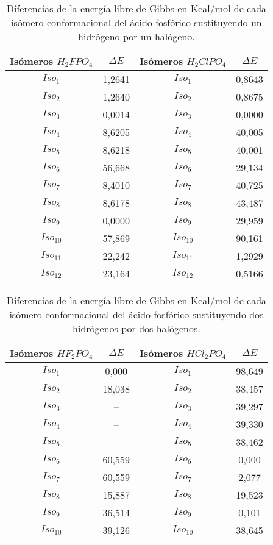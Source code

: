 \begin{table}[H]
\begin{center}
\begin{tabular}{|c|c|c|c|}
\hline
Isómeros $H_2FPO_4$ & $\Delta E$ & Isómeros $H_2ClPO_4$ & $\Delta E$ \\ \hline
$Iso_1$& 1,2641 & $Iso_1$ & 0,8643 \\ \hline
$Iso_2$ & 1,2640 & $Iso_2$ & 0,8675 \\ \hline
$Iso_3$ & 0,0014 & $Iso_3$ & 0,0000 \\ \hline
$Iso_4$	& 8,6205 & $Iso_4$ & 40,005 \\ \hline
$Iso_5$	& 8,6218 & $Iso_5$ & 40,001 \\ \hline
$Iso_6$	& 56,668 & $Iso_6$ & 29,134 \\ \hline
$Iso_7$	& 8,4010 & $Iso_7$ & 40,725 \\ \hline
$Iso_8$	& 8,6178 & $Iso_8$ & 43,487 \\ \hline
$Iso_9$	& 0,0000 & $Iso_9$ & 29,959 \\ \hline
$Iso_{10}$	& 57,869 & $Iso_{10}$ & 90,161 \\ \hline
$Iso_{11}$ & 22,242 & $Iso_{11}$ & 1,2929 \\ \hline
$Iso_{12}$ & 23,164 & $Iso_{12}$ & 0,5166 \\ \hline
\end{tabular}
\caption{Diferencias de la energía libre de Gibbs en Kcal/mol de cada isómero conformacional del ácido fosfórico sustituyendo un hidrógeno por un halógeno.}
\end{center}
\end{table}

\begin{table}[H]
	\centering
	\begin{tabular}{|c|c|c|c|}
		\hline
		Isómeros $HF_2PO_4$ & $\Delta E$   & Isómeros $HCl_2PO_4$ & $\Delta E$     \\ \hline
		$Iso_1$  & 0,000     & $Iso_1$     & 98,649 \\ \hline
		$Iso_2$  & 18,038    & $Iso_2$   & 38,457 \\ \hline
		$Iso_3$   & -- & $Iso_3$    & 39,297 \\ \hline
		$Iso_4$   & --& $Iso_4$    & 39,330 \\ \hline
		$Iso_5$   & -- & $Iso_5$  & 38,462 \\ \hline
		$Iso_6$    & 60,559    & $Iso_6$  & 0,000  \\ \hline
		$Iso_7$   & 60,559    & $Iso_7$   & 2,077  \\ \hline
		$Iso_8$    & 15,887    & $Iso_8$  & 19,523 \\ \hline
		$Iso_9$   & 36,514    & $Iso_9$   & 0,101  \\ \hline
		$Iso_{10}$  & 39,126    & $Iso_{10}$   & 38,645 \\ \hline
	\end{tabular}
\caption{Diferencias de la energía libre de Gibbs en Kcal/mol de cada isómero conformacional del ácido fosfórico sustituyendo dos hidrógenos por dos halógenos.}
\end{table}

